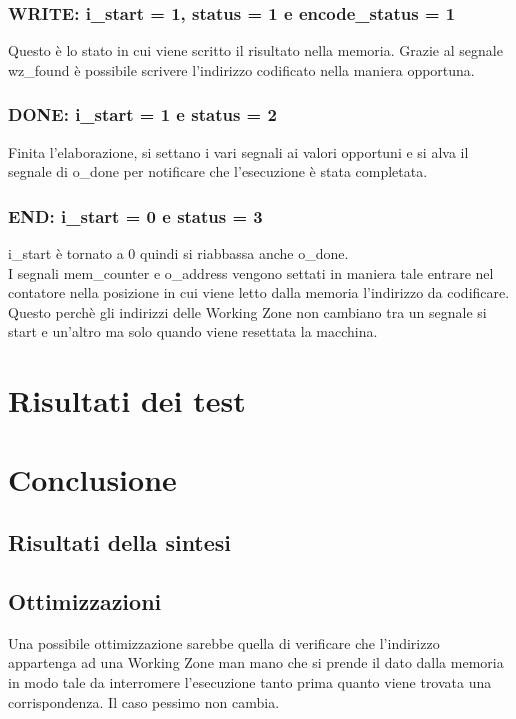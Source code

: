 \documentclass{article}
\begin{document}
\subsubsection{WRITE: {\selectfont i\_start} = 1, {\selectfont status} = 1 e {\selectfont encode\_status} = 1}
Questo è lo stato in cui viene scritto il risultato nella memoria. Grazie al segnale {\selectfont wz\_found} è possibile scrivere l'indirizzo codificato nella maniera opportuna.
\subsubsection{DONE: {\selectfont i\_start} = 1 e {\selectfont status} = 2}
Finita l'elaborazione, si settano i vari segnali ai valori opportuni e si alva il segnale di {\selectfont o\_done} per notificare che l'esecuzione è stata completata.
\subsubsection{END: {\selectfont i\_start} = 0 e {\selectfont status} = 3}
{\selectfont i\_start} è tornato a 0 quindi si riabbassa anche {\selectfont o\_done}.\\
I segnali {\selectfont mem\_counter} e {\selectfont o\_address} vengono settati in maniera tale entrare nel contatore nella posizione in cui viene letto dalla memoria l'indirizzo da codificare. Questo perchè gli indirizzi delle Working Zone non cambiano tra un segnale si start e un'altro ma solo quando viene resettata la macchina.
\pagebreak
\section{Risultati dei test}
\section{Conclusione}
\subsection{Risultati della sintesi}
\subsection{Ottimizzazioni}
Una possibile ottimizzazione sarebbe quella di verificare che l'indirizzo appartenga ad una Working Zone man mano che si prende il dato dalla memoria in modo tale da interromere l'esecuzione tanto prima quanto viene trovata una corrispondenza. Il caso pessimo non cambia.
\end{document}
